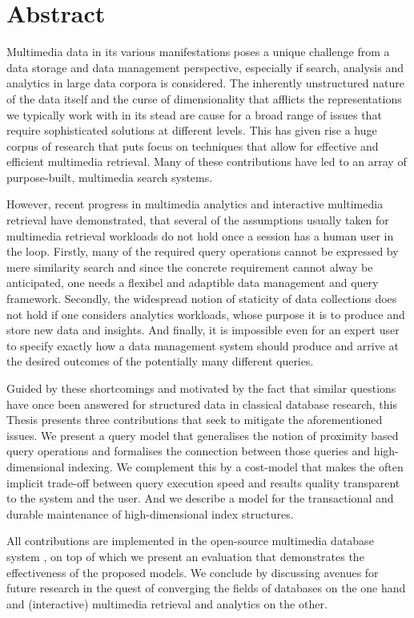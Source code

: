 
\chapter{Abstract}

Multimedia data in its various manifestations poses a unique challenge from a data storage and data management perspective, especially if search, analysis and analytics in large data corpora is considered. The inherently unstructured nature of the data itself and the curse of dimensionality that afflicts the representations we typically work with in its stead are cause for a broad range of issues that require sophisticated solutions at different levels. This has given rise a huge corpus of research that puts focus on techniques that allow for effective and efficient multimedia retrieval. Many of these contributions have led to an array of purpose-built, multimedia search systems.

However, recent progress in multimedia analytics and interactive multimedia retrieval have demonstrated, that several of the assumptions usually taken for multimedia retrieval workloads do not hold once a session has a human user in the loop. Firstly, many of the required query operations cannot be expressed by mere similarity search and since the concrete requirement cannot alway be anticipated, one needs a flexibel and adaptible data management and query framework. Secondly, the widespread notion of staticity of data collections does not hold if one considers analytics workloads, whose purpose it is to produce and store new data and insights. And finally, it is impossible even for an expert user to specify exactly how a data management system should produce and arrive at the desired outcomes of the potentially many different queries.

Guided by these shortcomings and motivated by the fact that similar questions have once been answered for structured data in classical database research, this Thesis presents three contributions that seek to mitigate the aforementioned issues. We present a query model that generalises the notion of proximity based query operations and formalises the connection between those queries and high-dimensional indexing. We complement this by a cost-model that makes the often implicit trade-off between query execution speed and results quality transparent to the system and the user. And we describe a model for the transactional and durable maintenance of high-dimensional index structures.

All contributions are implemented in the open-source multimedia database system \cottontail{}, on top of which we present an evaluation that demonstrates the effectiveness of the proposed models. We conclude by discussing avenues for future research in the quest of converging the fields of databases on the one hand and (interactive) multimedia retrieval and analytics on the other.